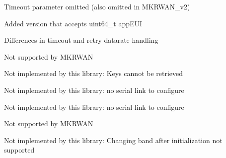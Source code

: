 
\begin{DoxyRefList}
\item[Module \mbox{\hyperlink{classSTM32LoRaWAN_amgrpb065e2dd26e727fc866b5360d675a71b}{OTAA Join}} ]\label{extensions__extensions000001}%
%
 Timeout parameter omitted (also omitted in MKRWAN\+\_\+v2) 

Added version that accepts uint64\+\_\+t app\+EUI 

Differences in timeout and retry datarate handling 
\item[Module \mbox{\hyperlink{classSTM32LoRaWAN_amgrp6a967c1d96e6900d14206c0d4ef2c3ea}{Setters for identifiers and keys}} ]\label{extensions__extensions000010}%
%
 Not supported by MKRWAN


\item[Member \mbox{\hyperlink{classSTM32LoRaWAN_af5a44ca0779d52ba0ed35235dd92e107}{STM32\+Lo\+Ra\+WAN\+::application\+Key}} ()]\label{extensions__extensions000044}%
%
 Not implemented by this library\+: Keys cannot be retrieved  
\item[Member \mbox{\hyperlink{classSTM32LoRaWAN_a51adb005319aa9c4ccb2f63b246789a1}{STM32\+Lo\+Ra\+WAN\+::auto\+Baud}} (unsigned long timeout=10000L)]\label{extensions__extensions000029}%
%
 Not implemented by this library\+: no serial link to configure  
\item[Member \mbox{\hyperlink{classSTM32LoRaWAN_a01766fa6242b566fde0010eef9707372}{STM32\+Lo\+Ra\+WAN\+::begin}} (\+\_\+lora\+\_\+band band, uint32\+\_\+t baud, uint16\+\_\+t config=SERIAL\+\_\+8\+N2)]\label{extensions__extensions000028}%
%
 Not implemented by this library\+: no serial link to configure  
\item[Member \mbox{\hyperlink{classSTM32LoRaWAN_ab3335b40c9a640200c4e3c345859ac80}{STM32\+Lo\+Ra\+WAN\+::busy}} ()]\label{extensions__extensions000011}%
%
 Not supported by MKRWAN  
\item[Member \mbox{\hyperlink{classSTM32LoRaWAN_a8c9e66574bd8137330de4067ee3bf2b8}{STM32\+Lo\+Ra\+WAN\+::configure\+Band}} (\+\_\+lora\+\_\+band band)]\label{extensions__extensions000049}%
%
 Not implemented by this library\+: Changing band after initialization not supported  
\item[Member \mbox{\hyperlink{classSTM32LoRaWAN_a077e0794bb3ac3c199f13e486933417b}{STM32\+Lo\+Ra\+WAN\+::configure\+Class}} (\+\_\+lora\+\_\+class \+\_\+class)]\label{extensions__extensions000041}%

\end{DoxyRefList}
